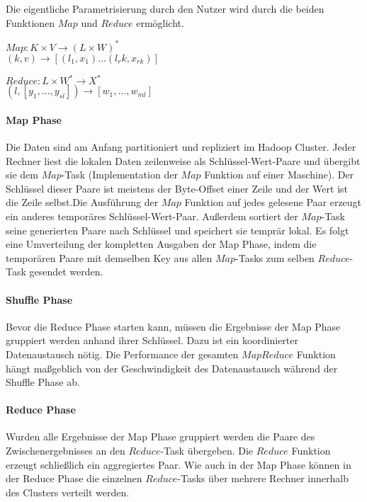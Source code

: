 Die eigentliche Parametrisierung durch den Nutzer wird durch die beiden Funktionen $Map$ und $Reduce$ ermöglicht.

\begin{center}
    $Map: K \times V \rightarrow (L \times W)^\ast$\\$(k, v) \rightarrow [(l_1, x_1) \dots (l_rk, x_{rk})]$
\end{center}
\begin{center}
    $Reduce: L \times W^\ast \rightarrow X^\ast$\\$(l, [y_1, \dots, y_{sl}]) \rightarrow [w_1, \dots, w_{ml}]$
\end{center}

\paragraph{Map Phase}$\;$ \\
Die Daten sind am Anfang partitioniert und repliziert im Hadoop Cluster. Jeder Rechner liest die lokalen Daten zeilenweise als Schlüssel-Wert-Paare und übergibt sie dem $Map$-Task (Implementation der $Map$ Funktion auf einer Maschine). Der Schlüssel dieser Paare ist meistens der Byte-Offset einer Zeile und der Wert ist die Zeile selbst.Die Ausführung der $Map$ Funktion auf jedes gelesene Paar erzeugt ein anderes temporäres Schlüssel-Wert-Paar. Außerdem sortiert der $Map$-Task seine generierten Paare nach Schlüssel und speichert sie temprär lokal. Es folgt eine Umverteilung der kompletten Ausgaben der Map Phase, indem die temporären Paare mit demselben Key aus allen $Map$-Tasks zum selben $Reduce$-Task gesendet werden.

\paragraph{Shuffle Phase}$\;$ \\
Bevor die Reduce Phase starten kann, müssen die Ergebnisse der Map Phase gruppiert werden anhand ihrer Schlüssel. Dazu ist ein koordinierter Datenaustausch nötig. Die Performance der gesamten $MapReduce$ Funktion hängt maßgeblich von der Geschwindigkeit des Datenaustausch während der Shuffle Phase ab.

\paragraph{Reduce Phase}$\;$ \\
Wurden alle Ergebnisse der Map Phase gruppiert werden die Paare des Zwischenergebnisses an den $Reduce$-Task übergeben. Die $Reduce$ Funktion erzeugt schließlich ein aggregiertes Paar. Wie auch in der Map Phase können in der Reduce Phase die einzelnen $Reduce$-Tasks über mehrere Rechner innerhalb des Clusters verteilt werden.


